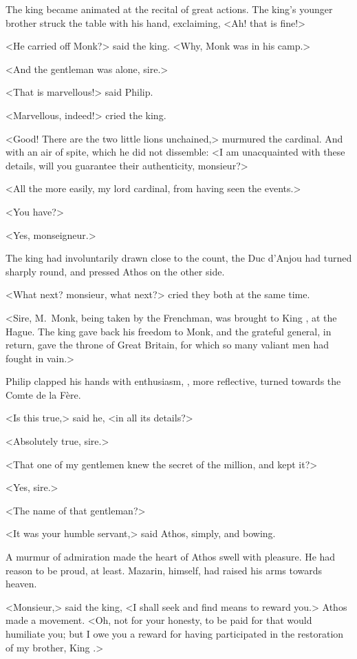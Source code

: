 The king became animated at the recital of great actions. The king's younger brother struck the table with his hand, exclaiming, <Ah! that is fine!>

<He carried off Monk?> said the king. <Why, Monk was in his camp.>

<And the gentleman was alone, sire.>

<That is marvellous!> said Philip.

<Marvellous, indeed!> cried the king.

<Good! There are the two little lions unchained,> murmured the cardinal. And with an air of spite, which he did not dissemble: <I am unacquainted with these details, will you guarantee their authenticity, monsieur?>

<All the more easily, my lord cardinal, from having seen the events.>

<You have?>

<Yes, monseigneur.>

The king had involuntarily drawn close to the count, the Duc d'Anjou had turned sharply round, and pressed Athos on the other side.

<What next? monsieur, what next?> cried they both at the same time.

<Sire, M.~Monk, being taken by the Frenchman, was brought to King , at the Hague. The king gave back his freedom to Monk, and the grateful general, in return, gave  the throne of Great Britain, for which so many valiant men had fought in vain.>

Philip clapped his hands with enthusiasm, , more reflective, turned towards the Comte de la Fère.

<Is this true,> said he, <in all its details?>

<Absolutely true, sire.>

<That one of my gentlemen knew the secret of the million, and kept it?>

<Yes, sire.>

<The name of that gentleman?>

<It was your humble servant,> said Athos, simply, and bowing.

A murmur of admiration made the heart of Athos swell with pleasure. He had reason to be proud, at least. Mazarin, himself, had raised his arms towards heaven.

<Monsieur,> said the king, <I shall seek and find means to reward you.> Athos made a movement. <Oh, not for your honesty, to be paid for that would humiliate you; but I owe you a reward for having participated in the restoration of my brother, King .>

